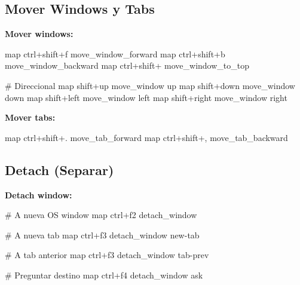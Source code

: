 \documentclass[
  doc,
  floatsintext,
  longtable,
  a4paper,
  nolmodern,
  notxfonts,
  notimes,
  12pt,
  colorlinks=true,linkcolor=blue,citecolor=blue,urlcolor=blue]{apa7}
\newenvironment{Shaded}{\begin{snugshade}}{\end{snugshade}}
\newcommand{\CommentTok}[1]{\textcolor[rgb]{0.37,0.37,0.37}{#1}}
\newcommand{\DataTypeTok}[1]{\textcolor[rgb]{0.68,0.00,0.00}{#1}}
\newcommand{\ErrorTok}[1]{\textcolor[rgb]{0.68,0.00,0.00}{#1}}
\begin{document}
\subsection{Mover Windows y Tabs}\label{mover-windows-y-tabs}

\textbf{Mover windows:}

\begin{Shaded}
\begin{Highlighting}[]
\DataTypeTok{map} \DataTypeTok{ctrl}\ErrorTok{+}\DataTypeTok{shift}\ErrorTok{+}\DataTypeTok{f} \DataTypeTok{move\_window\_forward}
\DataTypeTok{map} \DataTypeTok{ctrl}\ErrorTok{+}\DataTypeTok{shift}\ErrorTok{+}\DataTypeTok{b} \DataTypeTok{move\_window\_backward}
\DataTypeTok{map} \DataTypeTok{ctrl}\ErrorTok{+}\DataTypeTok{shift}\ErrorTok{+\textasciigrave{}} \DataTypeTok{move\_window\_to\_top}

\CommentTok{\# Direccional}
\DataTypeTok{map} \DataTypeTok{shift}\ErrorTok{+}\DataTypeTok{up} \DataTypeTok{move\_window} \DataTypeTok{up}
\DataTypeTok{map} \DataTypeTok{shift}\ErrorTok{+}\DataTypeTok{down} \DataTypeTok{move\_window} \DataTypeTok{down}
\DataTypeTok{map} \DataTypeTok{shift}\ErrorTok{+}\DataTypeTok{left} \DataTypeTok{move\_window} \DataTypeTok{left}
\DataTypeTok{map} \DataTypeTok{shift}\ErrorTok{+}\DataTypeTok{right} \DataTypeTok{move\_window} \DataTypeTok{right}
\end{Highlighting}
\end{Shaded}

\textbf{Mover tabs:}

\begin{Shaded}
\begin{Highlighting}[]
\DataTypeTok{map} \DataTypeTok{ctrl}\ErrorTok{+}\DataTypeTok{shift}\ErrorTok{+}\DataTypeTok{.} \DataTypeTok{move\_tab\_forward}
\DataTypeTok{map} \DataTypeTok{ctrl}\ErrorTok{+}\DataTypeTok{shift}\ErrorTok{+,} \DataTypeTok{move\_tab\_backward}
\end{Highlighting}
\end{Shaded}

\subsection{Detach (Separar)}\label{detach-separar}

\textbf{Detach window:}

\begin{Shaded}
\begin{Highlighting}[]
\CommentTok{\# A nueva OS window}
\DataTypeTok{map} \DataTypeTok{ctrl}\ErrorTok{+}\DataTypeTok{f2} \DataTypeTok{detach\_window}

\CommentTok{\# A nueva tab}
\DataTypeTok{map} \DataTypeTok{ctrl}\ErrorTok{+}\DataTypeTok{f3} \DataTypeTok{detach\_window} \DataTypeTok{new{-}tab}

\CommentTok{\# A tab anterior}
\DataTypeTok{map} \DataTypeTok{ctrl}\ErrorTok{+}\DataTypeTok{f3} \DataTypeTok{detach\_window} \DataTypeTok{tab{-}prev}

\CommentTok{\# Preguntar destino}
\DataTypeTok{map} \DataTypeTok{ctrl}\ErrorTok{+}\DataTypeTok{f4} \DataTypeTok{detach\_window} \DataTypeTok{ask}
\end{Highlighting}
\end{Shaded}
\end{document}

